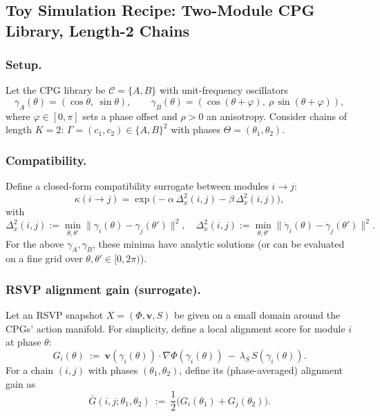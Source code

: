 \documentclass[a4paper,11pt]{article}
\begin{document}
\subsection{Toy Simulation Recipe: Two-Module CPG Library, Length-2 Chains}
\label{sec:cpg-sim}

\subsubsection{Setup.}
Let the CPG library be $\mathcal{C}=\{A,B\}$ with unit-frequency oscillators
\begin{equation}
\gamma_A(\theta)=(\cos\theta,\ \sin\theta),\qquad
\gamma_B(\theta)=(\cos(\theta+\varphi),\ \rho\,\sin(\theta+\varphi)),
\end{equation}
where $\varphi\in[0,\pi]$ sets a phase offset and $\rho>0$ an anisotropy.
Consider chains of length $K=2$: $\Gamma=(c_1,c_2)\in\{A,B\}^2$ with
phases $\Theta=(\theta_1,\theta_2)$.

\subsubsection{Compatibility.}
Define a closed-form compatibility surrogate between modules $i\to j$:
\begin{equation}
\kappa(i\!\to\! j)=\exp\!\Big(-\alpha\,\Delta_{x}^2(i,j)-\beta\,\Delta_{\dot{x}}^2(i,j)\Big),
\end{equation}
with
\begin{equation}
\Delta_{x}^2(i,j):=\min_{\theta,\theta'}\|\gamma_i(\theta)-\gamma_j(\theta')\|^2,\quad
\Delta_{\dot{x}}^2(i,j):=\min_{\theta,\theta'}\|\dot\gamma_i(\theta)-\dot\gamma_j(\theta')\|^2.
\end{equation}
For the above $\gamma_A,\gamma_B$, these minima have analytic solutions (or can
be evaluated on a fine grid over $\theta,\theta'\in[0,2\pi)$).

\subsubsection{RSVP alignment gain (surrogate).}
Let an RSVP snapshot $X=(\Phi,\mathbf v,S)$ be given on a small domain around
the CPGs’ action manifold. For simplicity, define a local alignment score
for module $i$ at phase $\theta$:
\begin{equation}
G_i(\theta)\ :=\ \mathbf v(\gamma_i(\theta))\cdot \nabla\Phi(\gamma_i(\theta))\ -\ \lambda_S\,S(\gamma_i(\theta)).
\end{equation}
For a chain $(i,j)$ with phases $(\theta_1,\theta_2)$, define its (phase-averaged)
alignment gain as
\begin{equation}
\overline{G}(i,j;\theta_1,\theta_2)\ :=\
\frac{1}{2}\Big( G_i(\theta_1)+G_j(\theta_2)\Big).
\end{equation}
\end{document}
